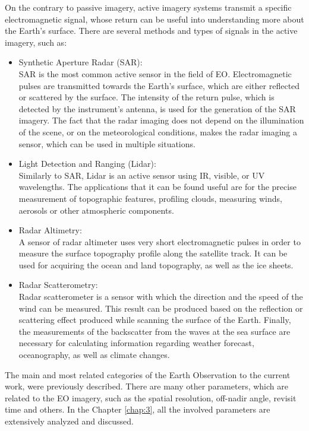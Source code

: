 On the contrary to passive imagery, active imagery systems transmit a specific electromagnetic signal, whose return can be useful into understanding more about the Earth's surface. There are several methods and types of signals in the active imagery, such as:
\begin{itemize}
\item Synthetic Aperture Radar (SAR): \\
SAR is the most common active sensor in the field of EO. Electromagnetic pulses are transmitted towards the Earth's surface, which are either reflected or scattered by the surface. The intensity of the return pulse, which is detected by the instrument's antenna, is used for the generation of the SAR imagery. The fact that the radar imaging does not depend on the illumination of the scene, or on the meteorological conditions, makes the radar imaging a sensor, which can be used in multiple situations.
\item Light Detection and Ranging (Lidar): \\
Similarly to SAR, Lidar is an active sensor using IR, visible, or UV wavelengths. The applications that it can be found useful are for the precise measurement of topographic features, profiling clouds, measuring winds, aerosols or other atmospheric components.
\item Radar Altimetry: \\
A sensor of radar altimeter uses very short electromagnetic pulses in order to measure the surface topography profile along the satellite track. It can be used for acquiring the ocean and land topography, as well as the ice sheets.
\item Radar Scatterometry: \\
Radar scatterometer is a sensor with which the direction and the speed of the wind can be measured. This result can be produced based on the reflection or scattering effect produced while scanning the surface of the Earth. Finally, the measurements of the backscatter from the waves at the sea surface are necessary for calculating information regarding weather forecast, oceanography, as well as climate changes.
\end{itemize}


\bigskip
The main and most related categories of the Earth Observation to the current work, were previously described. There are many other parameters, which are related to the EO imagery, such as the spatial resolution, off-nadir angle, revisit time and others. In the Chapter \ref{chap:3}, all the involved parameters are extensively analyzed and discussed. 


